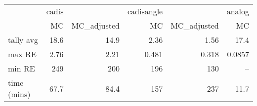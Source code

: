 \begin{tabular}{lrrrrr}
\toprule
{} & cadis &             & cadisangle &             & analog \\
{} &    MC & MC\_adjusted &         MC & MC\_adjusted &     MC \\
\midrule
tally avg   &  18.6 &        14.9 &       2.36 &        1.56 &   17.4 \\
max RE      &  2.76 &        2.21 &      0.481 &       0.318 & 0.0857 \\
min RE      &   249 &         200 &        196 &         130 &    -- \\
time (mins) &  67.7 &        84.4 &        157 &         237 &   11.7 \\
\bottomrule
\end{tabular}
